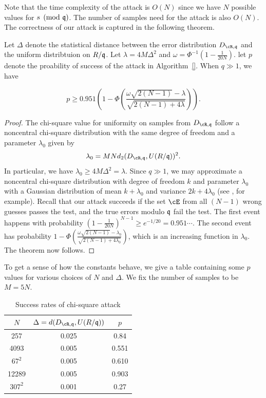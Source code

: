 \documentclass{amsart}
\begin{document}
Note that the time complexity of the attack is $O(N)$ since we have $N$ possible values for $s \pmod {\mathfrak{q}}$. The number of samples need for the attack is also $O(N)$. The correctness of our attack is captured in the following theorem.

\begin{theorem}
Let $\Delta$ denote the statistical distance between the error distribution $D_{\cR, \fq}$ and the uniform distribtuion on $R/\mathfrak{q}$. Let $\lambda = 4 M \Delta^2$ and $\omega = \Phi^{-1}(1- \frac{1}{20N})$. let $p$ denote the proability of success of the attack in Algorithm~\ref{}. When $q \gg 1$, we have

$$p \geq 0.951 \left(1- \Phi \left(\frac{\omega \sqrt{2(N-1)}- \lambda}{\sqrt{2(N-1) +4\lambda}}\right) \right).$$
\end{theorem}

\begin{proof}
The chi-square value for uniformity on samples from $D_{\cR, \fq}$ follow a noncentral chi-square distribution with the same degree of freedom and a parameter $\lambda_0$ given by
\[
    \lambda_0 = MN d_2(D_{\cR, \fq}, U(R/\fq))^2.
\]
In particular, we have $\lambda_0 \geq  4M\Delta^2 = \lambda$. Since $q \gg 1$, we may approximate a noncentral chi-square distribution with degree of freedom $k$ and parameter $\lambda_0$ with a Gaussian distribution of mean $k + \lambda_0$ and variance $2k + 4\lambda_0$ (see \cite{ryabko2004new}, for example). Recall that our attack succeeds if the set $\cE$ from all $(N-1)$ wrong guesses passes the test, and the true errors modulo $\mathfrak{q}$ fail the test. The first event happens with probability $(1 - \frac{1}{20N})^{N-1} \geq e^{-1/20} = 0.951 \cdots$. The second event has probability $1 - \Phi \left(\frac{\omega \sqrt{2(N-1)}- \lambda_0}{\sqrt{2(N-1) +4\lambda_0}}\right) $, which is an increasing function in $\lambda_0$. The theorem now follows.
\end{proof}

To get a sense of how the constants behave, we give a table containing some $p$ values for various choices of $N$ and $\Delta$. We fix the number of samples to be $M = 5N$.

\begin{table}[H]
\caption{Success rates of chi-square attack}
\begin{tabular}{c|c|c}
$N$ & $\Delta = d(D_{\cR, \fq},U(R/\fq))$ & $p$ \\ \hline
257 & 0.025 & 0.84 \\
4093 &   0.005     &  0.551 \\
$67^2$ & 0.005 & 0.610 \\
12289 & 0.005  & 0.903 \\
$307^2$ & 0.001 & 0.27
\end{tabular}
\end{table}
\end{document}

